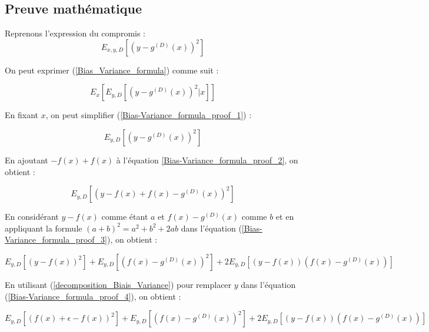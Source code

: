 \documentclass[a4paper]{article}
\begin{document}
\begin{appendices}
	
	\section{Preuve mathématique}
	
	Reprenons l'expression du compromis :
	\begin{equation}
		\label{Bias_Variance_formula}
		E_{x,y,D}[(y-g^{(D)}(x))^2]
	\end{equation}
	
	On peut exprimer (\ref{Bias_Variance_formula}) comme suit : 
	
	\begin{equation}
		\label{Bias-Variance_formula_proof_1}
		E_x [E_{y,D} [(y - g^{(D)}(x))^2 | x]]
	\end{equation}
	
	En fixant $x$, on peut simplifier (\ref{Bias-Variance_formula_proof_1}) :
	
	\begin{equation}
		\label{Bias-Variance_formula_proof_2}
		E_{y,D}[ (y - g^{(D)}(x))^2]
	\end{equation}
	
	En ajoutant $ - f(x) + f(x) $ à l'équation \ref{Bias-Variance_formula_proof_2}, on obtient :
	
	\begin{equation}
		\label{Bias-Variance_formula_proof_3}
		E_{y,D}[ (y - f(x) + f(x) - g^{(D)}(x))^2]
	\end{equation}
	
	En considérant $ y - f(x) $ comme étant $a$ et $ f(x) - g^{(D)}(x)$ comme $b$ et en appliquant la formule $(a+b)^2 = a^2 + b^2 + 2ab$ dans l'équation (\ref{Bias-Variance_formula_proof_3}), on obtient :
	
	\begin{equation}
		\label{Bias-Variance_formula_proof_4}
		E_{y,D} [(y-f(x))^2] + E_{y,D} [(f(x) - g^{(D)}(x))^2] + 2E_{y,D} [(y-f(x)) (f(x) - g^{(D)}(x)) ]
	\end{equation}
	
	En utilisant (\ref{decomposition_Biais_Variance}) pour remplacer $y$ dans l'équation (\ref{Bias-Variance_formula_proof_4}), on obtient :
	
	\begin{equation}
		\label{Bias-Variance_formula_proof_5}
		E_{y,D} [(f(x) + \epsilon - f(x))^2] + E_{y,D} [(f(x) - g^{(D)}(x))^2] + 2E_{y,D} [(y-f(x)) (f(x) - g^{(D)}(x)) ]
	\end{equation}
	

\end{appendices}
\end{document}
